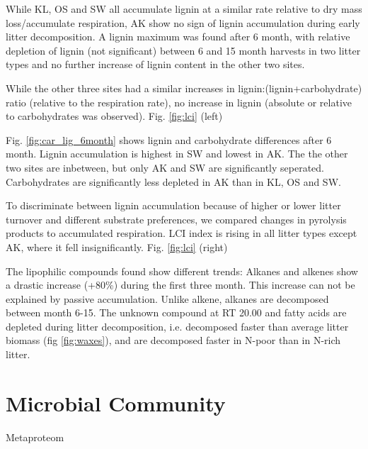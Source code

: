While KL, OS and SW all accumulate lignin at a similar rate relative to dry mass loss/accumulate respiration, AK show no sign of lignin accumulation during early litter decomposition. A lignin maximum was found after 6 month, with relative depletion of lignin (not significant) between 6 and 15 month harvests in two litter types and no further increase of lignin content in the other two sites. 

While the other three sites had a similar increases in lignin:(lignin+carbohydrate) ratio (relative to the respiration rate), no increase in lignin (absolute or relative to carbohydrates was observed). Fig. \ref{fig:lci} (left)

Fig. \ref{fig:car_lig_6month} shows lignin and carbohydrate differences after 6 month. Lignin accumulation is highest in SW and lowest in AK. The the other two sites are inbetween, but only AK and SW are significantly seperated. Carbohydrates are significantly less depleted in AK than in KL, OS and SW. 

To discriminate between lignin accumulation because of higher or lower litter turnover and different substrate preferences, we compared changes in pyrolysis products to accumulated respiration. LCI index is rising in all litter types except AK, where it fell insignificantly.
Fig. \ref{fig:lci} (right)

The lipophilic compounds found show different trends: Alkanes and alkenes show a drastic increase (+80\%) during the first three month. This increase can not be explained by passive accumulation. Unlike alkene, alkanes are decomposed between month 6-15. The unknown compound at RT 20.00 and fatty acids are depleted during litter decomposition, i.e. decomposed faster than average litter biomass (fig \ref{fig:waxes}), and are decomposed faster in N-poor than in N-rich litter. 



\section{Microbial Community}

Metaproteom
